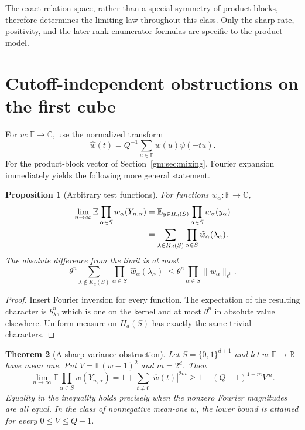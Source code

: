 \documentclass[11pt,a4paper]{article}
\numberwithin{equation}{section}
\newtheorem{theorem}{Theorem}[section]
\newtheorem{proposition}[theorem]{Proposition}
\theoremstyle{definition}
\theoremstyle{remark}
\newcommand{\F}{\mathbb F}
\newcommand{\E}{\mathbb E}
\newcommand{\1}{\mathbf 1}
\newcommand{\norm}[1]{\lVert #1\rVert}
\begin{document}
The exact relation space, rather than a special symmetry of product
blocks, therefore determines the limiting law throughout this class.
Only the sharp rate, positivity, and the later rank-enumerator formulas
are specific to the product model.

\section{Cutoff-independent obstructions on the first cube}
\label{gm:sec:cutoffs}

For $w:\F\to\mathbb C$, use the normalized transform
\[
 \widehat w(t)=Q^{-1}\sum_{u\in\F}w(u)\psi(-tu).
\]
For the product-block vector of Section~\ref{gm:sec:mixing}, Fourier
expansion immediately yields the following more general statement.

\begin{proposition}[Arbitrary test functions]\label{gm:prop:weighted}
For functions $w_\alpha:\F\to\mathbb C$,
\begin{align}
 \lim_{n\to\infty}\E\prod_{\alpha\in S}w_\alpha(Y_{n,\alpha})
 &=\E_{y\in H_d(S)}\prod_{\alpha\in S}w_\alpha(y_\alpha)\notag\\
 &=\sum_{\lambda\in K_d(S)}\prod_{\alpha\in S}\widehat w_\alpha(\lambda_\alpha).
 \label{gm:eq:weighted-limit}
\end{align}
The absolute difference from the limit is at most
\begin{equation}\label{gm:eq:weighted-error}
 \theta^n\sum_{\lambda\notin K_d(S)}
       \prod_{\alpha\in S}|\widehat w_\alpha(\lambda_\alpha)|
 \leq\theta^n\prod_{\alpha\in S}\norm{\widehat w_\alpha}_{\ell^1}.
\end{equation}
\end{proposition}

\begin{proof}
Insert Fourier inversion for every function. The expectation of the
resulting character is $b_\lambda^n$, which is one on the kernel and at
most $\theta^n$ in absolute value elsewhere. Uniform measure on $H_d(S)$
has exactly the same trivial characters.
\end{proof}

\begin{theorem}[A sharp variance obstruction]\label{gm:thm:variance}
Let $S=\{0,1\}^{d+1}$ and let $w:\F\to\mathbb R$ have mean one. Put
$V=\E(w-1)^2$ and $m=2^d$. Then
\begin{equation}\label{gm:eq:cube-cutoff}
 \lim_{n\to\infty}\E\prod_{\alpha\in S}w(Y_{n,\alpha})
   =1+\sum_{t\ne0}|\widehat w(t)|^{2m}
   \geq1+(Q-1)^{1-m}V^m.
\end{equation}
Equality in the inequality holds precisely when the nonzero Fourier
magnitudes are all equal. In the class of nonnegative mean-one $w$, the
lower bound is attained for every $0\leq V\leq Q-1$.
\end{theorem}
\end{document}
